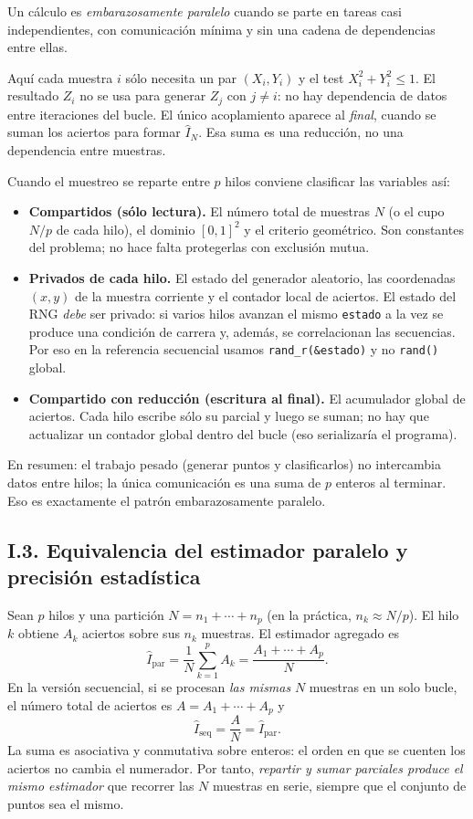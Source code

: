 \documentclass[12pt,a4paper]{article}
\begin{document}
Un c\'alculo es \emph{embarazosamente paralelo} cuando se parte en tareas casi independientes, con comunicaci\'on m\'inima y sin una cadena de dependencias entre ellas.

Aqu\'i cada muestra $i$ s\'olo necesita un par $(X_i,Y_i)$ y el test $X_i^2+Y_i^2\le 1$. El resultado $Z_i$ no se usa para generar $Z_{j}$ con $j\neq i$: no hay dependencia de datos entre iteraciones del bucle. El \'unico acoplamiento aparece al \emph{final}, cuando se suman los aciertos para formar $\hat I_N$. Esa suma es una reducci\'on, no una dependencia entre muestras.

Cuando el muestreo se reparte entre $p$ hilos conviene clasificar las variables as\'i:

\begin{itemize}
  \item \textbf{Compartidos (s\'olo lectura).} El n\'umero total de muestras $N$ (o el cupo $N/p$ de cada hilo), el dominio $[0,1]^2$ y el criterio geom\'etrico. Son constantes del problema; no hace falta protegerlas con exclusi\'on mutua.

  \item \textbf{Privados de cada hilo.} El estado del generador aleatorio, las coordenadas $(x,y)$ de la muestra corriente y el contador local de aciertos. El estado del RNG \emph{debe} ser privado: si varios hilos avanzan el mismo \texttt{estado} a la vez se produce una condici\'on de carrera y, adem\'as, se correlacionan las secuencias. Por eso en la referencia secuencial usamos \texttt{rand\_r(\&estado)} y no \texttt{rand()} global.

  \item \textbf{Compartido con reducci\'on (escritura al final).} El acumulador global de aciertos. Cada hilo escribe s\'olo su parcial y luego se suman; no hay que actualizar un contador global dentro del bucle (eso serializar\'ia el programa).
\end{itemize}

En resumen: el trabajo pesado (generar puntos y clasificarlos) no intercambia datos entre hilos; la \'unica comunicaci\'on es una suma de $p$ enteros al terminar. Eso es exactamente el patr\'on embarazosamente paralelo.

\subsection*{I.3. Equivalencia del estimador paralelo y precisi\'on estad\'istica}

Sean $p$ hilos y una partici\'on $N = n_1+\cdots+n_p$ (en la pr\'actica, $n_k \approx N/p$). El hilo $k$ obtiene $A_k$ aciertos sobre sus $n_k$ muestras. El estimador agregado es
\[
\hat I_{\mathrm{par}}
= \frac{1}{N}\sum_{k=1}^{p} A_k
= \frac{A_1+\cdots+A_p}{N}.
\]
En la versi\'on secuencial, si se procesan \emph{las mismas} $N$ muestras en un solo bucle, el n\'umero total de aciertos es $A = A_1+\cdots+A_p$ y
\[
\hat I_{\mathrm{seq}} = \frac{A}{N} = \hat I_{\mathrm{par}}.
\]
La suma es asociativa y conmutativa sobre enteros: el orden en que se cuenten los aciertos no cambia el numerador. Por tanto, \emph{repartir y sumar parciales produce el mismo estimador} que recorrer las $N$ muestras en serie, siempre que el conjunto de puntos sea el mismo.
\end{document}
